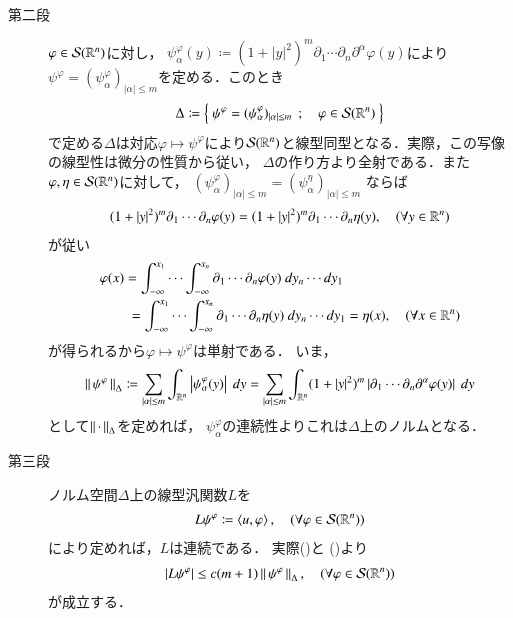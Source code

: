 \begin{prf}
\begin{description}
			\item[第二段]
				$\varphi \in \mathcal{S}(\mathbb{R}^n)$に対し，
				$\psi^\varphi_\alpha(y) \coloneqq (1+|y|^2)^m \partial_1 \cdots \partial_n\partial^\alpha \varphi(y)$により$\psi^\varphi = (\psi^\varphi_\alpha)_{|\alpha| \leq m}$を定める．このとき
				\begin{align}
					\Delta \coloneqq \left\{\ \psi^\varphi = (\psi^\varphi_\alpha)_{|\alpha| \leq m}\ \, ; \quad \varphi \in \mathcal{S}(\mathbb{R}^n)\ \right\}
				\end{align}
				で定める$\Delta$は対応$\varphi \longmapsto \psi^\varphi$により$\mathcal{S}(\mathbb{R}^n)$と線型同型となる．実際，この写像の線型性は微分の性質から従い，
				$\Delta$の作り方より全射である．また
				$\varphi,\eta \in \mathcal{S}(\mathbb{R}^n)$に対して，
				$(\psi^\varphi_\alpha)_{|\alpha| \leq m} = (\psi^\eta_\alpha)_{|\alpha| \leq m}$
				ならば
				\begin{align}
					(1+|y|^2)^m \partial_1 \cdots \partial_n \varphi(y)
					= (1+|y|^2)^m \partial_1 \cdots \partial_n \eta(y),
					\quad (\forall y \in \mathbb{R}^n)
				\end{align}
				が従い
				\begin{align}
					&\varphi(x)
					= \int_{-\infty}^{x_1}\cdots\int_{-\infty}^{x_n} \partial_1 \cdots \partial_n \varphi(y)\ dy_n\cdots dy_1 \\
					&\qquad = \int_{-\infty}^{x_1}\cdots\int_{-\infty}^{x_n} \partial_1 \cdots \partial_n \eta(y)\ dy_n\cdots dy_1
					= \eta(x),
					\quad (\forall x \in \mathbb{R}^n)
				\end{align}
				が得られるから$\varphi \longmapsto \psi^\varphi$は単射である．
				いま，
				\begin{align}
					\Norm{\psi^\varphi}{\Delta}
					\coloneqq \sum_{|\alpha| \leq m} \int_{\R^n} \left| \psi^\varphi_\alpha(y) \right|\ dy
					= \sum_{|\alpha| \leq m} \int_{\R^n} (1+|y|^2)^m \left| \partial_1 \cdots \partial_n\partial^\alpha \varphi(y) \right|\ dy
					\label{eq:structure_theorem_of_tempered_distributions_2}
				\end{align}
				として$\left\|\, \cdot\, \right\|_{\Delta}$を定めれば，
				$\psi^\varphi_\alpha$の連続性よりこれは$\Delta$上のノルムとなる．
				
			\item[第三段]
				ノルム空間$\Delta$上の線型汎関数$L$を
				\begin{align}
					L\psi^\varphi
					\coloneqq \inprod<u,\varphi>,
					\quad (\forall \varphi \in \rapid{\R^n})
				\end{align}
				により定めれば，$L$は連続である．
				実際()と
				()より
				\begin{align}
					\left| L\psi^\varphi \right|
					\leq c (m+1) \left\|\, \psi^\varphi\, \right\|_{\Delta},
					\quad (\forall \varphi \in \mathcal{S}(\mathbb{R}^n))
				\end{align}
				が成立する．
				

\end{description}
\end{prf}
